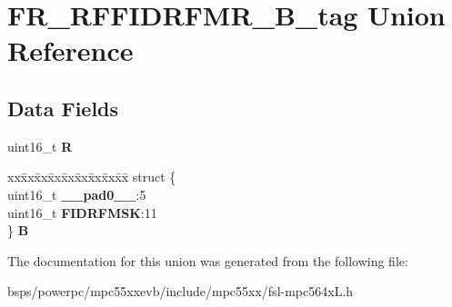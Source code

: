 \hypertarget{unionFR__RFFIDRFMR__16B__tag}{}\section{F\+R\+\_\+\+R\+F\+F\+I\+D\+R\+F\+M\+R\+\_\+B\+\_\+tag Union Reference}
\label{unionFR__RFFIDRFMR__16B__tag}
\subsection*{Data Fields}
\begin{DoxyCompactItemize}
\item 
\mbox{\label{unionFR__RFFIDRFMR__16B__tag_a8015b1fd55074dcd348b88b68e507bfe}} 
uint16\+\_\+t {\bfseries R}
\item 
\mbox{\label{unionFR__RFFIDRFMR__16B__tag_ac29ab4b83b3a5f1f80dc07e9a73e7f9d}} 
\begin{tabbing}
xx\=xx\=xx\=xx\=xx\=xx\=xx\=xx\=xx\=\kill
struct \{\\
\>uint16\_t {\bfseries \_\_pad0\_\_}:5\\
\>uint16\_t {\bfseries FIDRFMSK}:11\\
\} {\bfseries B}\\

\end{tabbing}\end{DoxyCompactItemize}


The documentation for this union was generated from the following file\+:\begin{DoxyCompactItemize}
\item 
bsps/powerpc/mpc55xxevb/include/mpc55xx/fsl-\/mpc564x\+L.\+h\end{DoxyCompactItemize}
